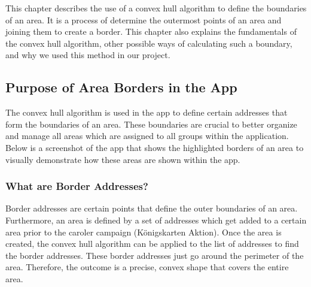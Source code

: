 \Author{\daAuthorThree}

    This chapter describes the use of a convex hull algorithm to define the boundaries of an area. It is a process of determine the outermost points of an area and joining them to create a border. This chapter also explains the fundamentals of the convex hull algorithm, other possible ways of calculating such a boundary, and why we used this method in our project.

    \subsection{Purpose of Area Borders in the App}
    The convex hull algorithm is used in the app to define certain addresses that form the boundaries of an area. These boundaries are crucial to better organize and manage all areas which are assigned to all groups within the application. Below is a screenshot of the app that shows the highlighted borders of an area to visually demonstrate how these areas are shown within the app.

    \subsubsection{What are Border Addresses?}
    Border addresses are certain points that define the outer boundaries of an area. Furthermore, an area is defined by a set of addresses which get added to a certain area prior to the caroler campaign (Königskarten Aktion). Once the area is created, the convex hull algorithm can be applied to the list of addresses to find the border addresses. These border addresses just go around the perimeter of the area. Therefore, the outcome is a precise, convex shape that covers the entire area.
    
